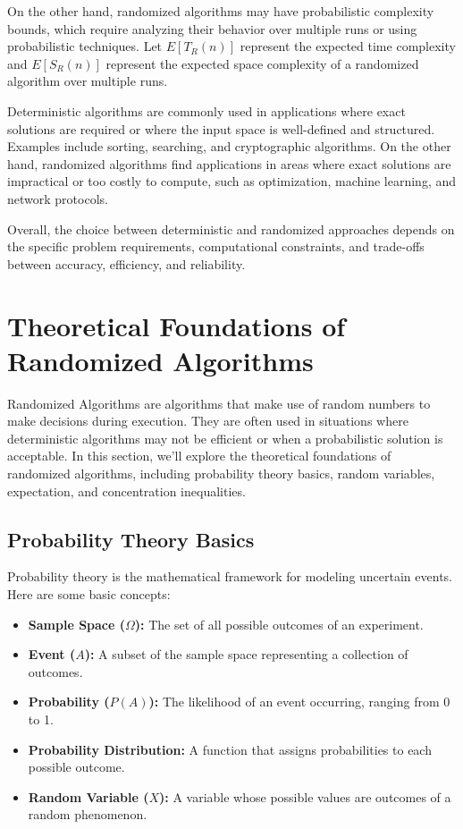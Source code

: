 \documentclass[12pt]{book} %
\begin{document}
On the other hand, randomized algorithms may have probabilistic complexity bounds, which require analyzing their behavior over multiple runs or using probabilistic techniques. Let \(E[T_R(n)]\) represent the expected time complexity and \(E[S_R(n)]\) represent the expected space complexity of a randomized algorithm over multiple runs.


Deterministic algorithms are commonly used in applications where exact solutions are required or where the input space is well-defined and structured. Examples include sorting, searching, and cryptographic algorithms. On the other hand, randomized algorithms find applications in areas where exact solutions are impractical or too costly to compute, such as optimization, machine learning, and network protocols.

Overall, the choice between deterministic and randomized approaches depends on the specific problem requirements, computational constraints, and trade-offs between accuracy, efficiency, and reliability.


\section{Theoretical Foundations of Randomized Algorithms}

Randomized Algorithms are algorithms that make use of random numbers to make decisions during execution. They are often used in situations where deterministic algorithms may not be efficient or when a probabilistic solution is acceptable. In this section, we'll explore the theoretical foundations of randomized algorithms, including probability theory basics, random variables, expectation, and concentration inequalities.

\subsection{Probability Theory Basics}

Probability theory is the mathematical framework for modeling uncertain events. Here are some basic concepts:

\begin{itemize}
    \item \textbf{Sample Space (\(\Omega\)):} The set of all possible outcomes of an experiment.
    \item \textbf{Event (\(A\)):} A subset of the sample space representing a collection of outcomes.
    \item \textbf{Probability (\(P(A)\)):} The likelihood of an event occurring, ranging from 0 to 1.
    \item \textbf{Probability Distribution:} A function that assigns probabilities to each possible outcome.
    \item \textbf{Random Variable (\(X\)):} A variable whose possible values are outcomes of a random phenomenon.
\end{itemize}
\end{document}

